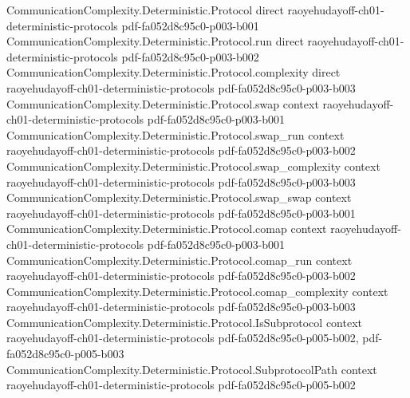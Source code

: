 \begin{theorem}
\label{CommunicationComplexity.Deterministic.Protocol.card_transcript_le_two_pow_complexity}
\leanok
{}
\proofstep
  {CommunicationComplexity.Deterministic.Protocol}
  {direct}
  {raoyehudayoff-ch01-deterministic-protocols}
  {pdf-fa052d8c95c0-p003-b001}
\proofstep
  {CommunicationComplexity.Deterministic.Protocol.run}
  {direct}
  {raoyehudayoff-ch01-deterministic-protocols}
  {pdf-fa052d8c95c0-p003-b002}
\proofstep
  {CommunicationComplexity.Deterministic.Protocol.complexity}
  {direct}
  {raoyehudayoff-ch01-deterministic-protocols}
  {pdf-fa052d8c95c0-p003-b003}
\proofstep
  {CommunicationComplexity.Deterministic.Protocol.swap}
  {context}
  {raoyehudayoff-ch01-deterministic-protocols}
  {pdf-fa052d8c95c0-p003-b001}
\proofstep
  {CommunicationComplexity.Deterministic.Protocol.swap_run}
  {context}
  {raoyehudayoff-ch01-deterministic-protocols}
  {pdf-fa052d8c95c0-p003-b002}
\proofstep
  {CommunicationComplexity.Deterministic.Protocol.swap_complexity}
  {context}
  {raoyehudayoff-ch01-deterministic-protocols}
  {pdf-fa052d8c95c0-p003-b003}
\proofstep
  {CommunicationComplexity.Deterministic.Protocol.swap_swap}
  {context}
  {raoyehudayoff-ch01-deterministic-protocols}
  {pdf-fa052d8c95c0-p003-b001}
\proofstep
  {CommunicationComplexity.Deterministic.Protocol.comap}
  {context}
  {raoyehudayoff-ch01-deterministic-protocols}
  {pdf-fa052d8c95c0-p003-b001}
\proofstep
  {CommunicationComplexity.Deterministic.Protocol.comap_run}
  {context}
  {raoyehudayoff-ch01-deterministic-protocols}
  {pdf-fa052d8c95c0-p003-b002}
\proofstep
  {CommunicationComplexity.Deterministic.Protocol.comap_complexity}
  {context}
  {raoyehudayoff-ch01-deterministic-protocols}
  {pdf-fa052d8c95c0-p003-b003}
\proofstep
  {CommunicationComplexity.Deterministic.Protocol.IsSubprotocol}
  {context}
  {raoyehudayoff-ch01-deterministic-protocols}
  {pdf-fa052d8c95c0-p005-b002,
    pdf-fa052d8c95c0-p005-b003}
\proofstep
  {CommunicationComplexity.Deterministic.Protocol.SubprotocolPath}
  {context}
  {raoyehudayoff-ch01-deterministic-protocols}
  {pdf-fa052d8c95c0-p005-b002}

\end{theorem}
